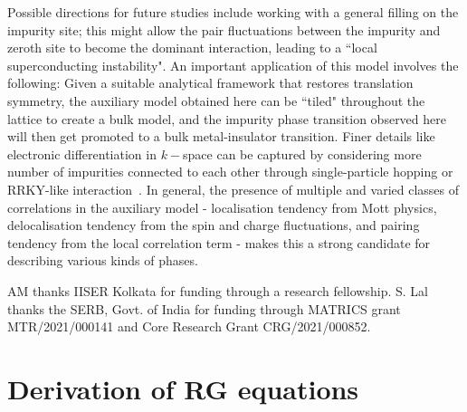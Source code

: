\documentclass[reprint,superscriptaddress,floatfix]{revtex4-2}
\begin{document}
Possible directions for future studies include working with a general filling on the impurity site; this might allow the pair fluctuations between the impurity and zeroth site to become the dominant interaction, leading to a ``local superconducting instability".
An important application of this model involves the following: Given a suitable analytical framework that restores translation symmetry, the auxiliary model obtained here can be ``tiled" throughout the lattice to create a bulk model, and the impurity phase transition observed here will then get promoted to a bulk metal-insulator transition.
Finer details like electronic differentiation in \(k-\)space can be captured by considering more number of impurities connected to each other through single-particle hopping or RRKY-like interaction~\cite{Ferrero2007,sakai_2009}.
In general, the presence of multiple and varied classes of correlations in the auxiliary model - localisation tendency from Mott physics, delocalisation tendency from the spin and charge fluctuations, and pairing tendency from the local correlation term - makes this a strong candidate for describing various kinds of phases.

\acknowledgments
AM thanks IISER Kolkata for funding through a research fellowship. S. Lal thanks the SERB, Govt. of India for funding through MATRICS grant MTR/2021/000141 and Core Research Grant CRG/2021/000852.



\appendix

\section{Derivation of RG equations}
\end{document}
